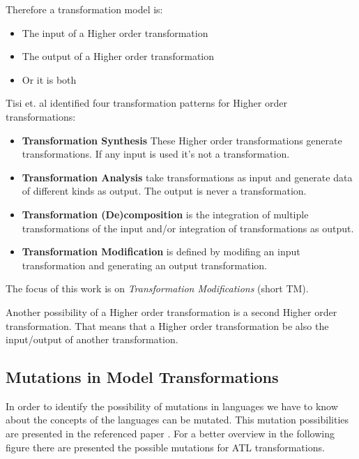 \documentclass{llncs}
\begin{document}
Therefore a transformation model is:

\begin{itemize}
	\item The input of a Higher order transformation
	\item The output of a Higher order transformation
	\item Or it is both
\end{itemize}

Tisi et. al identified four transformation patterns for Higher order transformations:

\begin{itemize}
	\item \textbf{Transformation Synthesis} These Higher order transformations generate transformations. If any input is used it's not a transformation.
	\item \textbf{Transformation Analysis} take transformations as input and generate data of different kinds as output. The output is never a transformation.
	\item \textbf{Transformation (De)composition} is the integration of multiple transformations of the input and/or integration of transformations as output.
	\item \textbf{Transformation Modification} is defined by modifing an input transformation and generating an output transformation.
\end{itemize}

The focus of this work is on \textit{Transformation Modifications} (short TM). 

Another possibility of a Higher order transformation is a second Higher order
transformation. That means that a Higher order transformation be also the
input/output of another transformation.

\subsection{Mutations in Model Transformations}
In order to identify the possibility of mutations in languages we have to know
about the concepts of the languages can be mutated. This mutation possibilities
are presented in the referenced paper \cite{troya:2015}. For a better overview
in the following figure there are presented the possible mutations for ATL
transformations.\label{fig:mutations_ATL}
\end{document}

